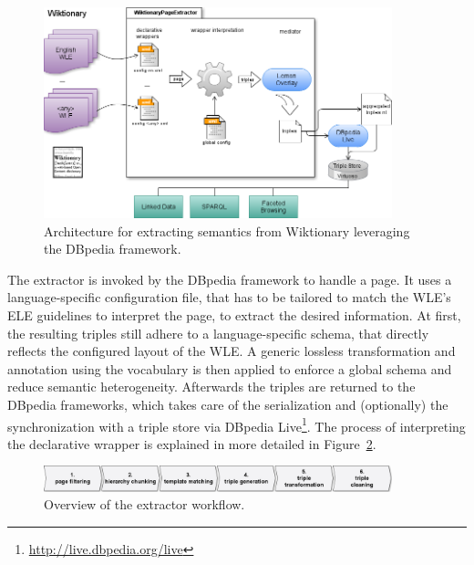 \begin{figure}[tb]
\centering
\includegraphics[width=0.9\textwidth]{./images/architecture.png}
\caption{Architecture for extracting semantics from Wiktionary leveraging the DBpedia framework.}
\label{fig:architecture}
\end{figure}
The \wik extractor is invoked by the DBpedia framework to handle a page.
It uses a language-specific configuration file, that has to be tailored to match the WLE's ELE guidelines to interpret the page, to extract the desired information. 
At first, the resulting triples still adhere to a language-specific schema, that directly reflects the configured layout of the WLE. 
A generic lossless transformation and annotation using the \lemon vocabulary is then applied to enforce a global schema and reduce semantic heterogeneity. 
Afterwards the triples are returned to the DBpedia frameworks, which takes care of the serialization and (optionally) the synchronization with a triple store via DBpedia Live\footnote{\url{http://live.dbpedia.org/live}}.
The process of interpreting the declarative wrapper is explained in more detailed in Figure~\ref{fig:extractor}.

\begin{figure}[tb]
\centering
\includegraphics[width=0.9\textwidth]{./images/extractor.png}
\caption{Overview of the extractor workflow.}
\label{fig:extractor}
\end{figure}



\vfill
\newpage
